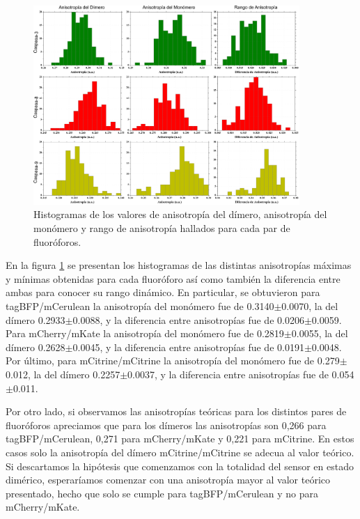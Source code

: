 \begin{figure}
    \centering
    \includegraphics[width=0.9\textwidth]{./img/Cap4/HistogramasAnisos.png}
    \caption{Histogramas de los valores de anisotropía del dímero, anisotropía del monómero y rango de anisotropía hallados para cada par de fluoróforos.}
    \label{fig:HistogramasAnisos}
\end{figure}

En la figura \ref{fig:HistogramasAnisos} se presentan los histogramas de las distintas anisotropías máximas y mínimas obtenidas para cada fluoróforo así como también la diferencia entre ambas para conocer su rango dinámico. En particular, se obtuvieron para tagBFP/mCerulean la anisotropía del monómero fue de 0.3140$\pm$0.0070, la del dímero 0.2933$\pm$0.0088, y la diferencia entre anisotropías fue de 0.0206$\pm$0.0059. Para mCherry/mKate la anisotropía del monómero fue de 0.2819$\pm$0.0055, la del dímero 0.2628$\pm$0.0045, y la diferencia entre anisotropías fue de 0.0191$\pm$0.0048. Por último, para mCitrine/mCitrine la anisotropía del monómero fue de 0.279$\pm$0.012, la del dímero 0.2257$\pm$0.0037, y la diferencia entre anisotropías fue de 0.054$\pm$0.011. 

Por otro lado, si observamos las anisotropías teóricas para los distintos pares de fluoróforos apreciamos que para los dímeros las anisotropías son 0,266 para tagBFP/mCerulean, 0,271 para mCherry/mKate y 0,221 para mCitrine. En estos casos solo la anisotropía del dímero mCitrine/mCitrine se adecua al valor teórico. Si descartamos la hipótesis que comenzamos con la totalidad del sensor en estado dimérico, esperaríamos comenzar con una anisotropía mayor al valor teórico presentado, hecho que solo se cumple para tagBFP/mCerulean y no para mCherry/mKate.

